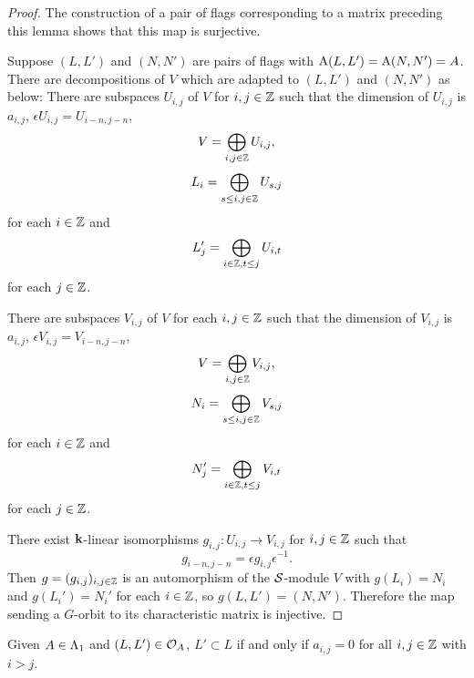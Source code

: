 \documentclass[a4paper, 11pt, twoside]{report}
\begin{document}
\begin{proof}
The construction of a pair of flags corresponding to a matrix preceding this lemma shows that this map is surjective.

Suppose $(L,L')$ and $(N,N')$ are pairs of flags with $\operatorname{A}(L,L')=\operatorname{A}(N,N')=A$. There are decompositions of $V$ which are adapted to $(L,L')$ and $(N,N')$ as below:
There are subspaces $U_{i,j}$ of $V$ for $i,j\in\mathbb{Z}$ such that the dimension of $U_{i,j}$ is $a_{i,j}$, $\epsilon U_{i,j}=U_{i-n,j-n}$,
\begin{equation*}
V=\bigoplus_{i,j\in\mathbb{Z}} U_{i,j},
\end{equation*}
\begin{equation*}
L_i = \bigoplus_{s\le i,j\in\mathbb{Z}} U_{s,j}
\end{equation*}
for each $i\in\mathbb{Z}$ and
\begin{equation*}
L_j' = \bigoplus_{i\in\mathbb{Z},t\le j} U_{i,t}
\end{equation*}
for each $j\in\mathbb{Z}$.

There are subspaces $V_{i,j}$ of $V$ for each $i,j\in\mathbb{Z}$ such that the dimension of $V_{i,j}$ is $a_{i,j}$, $\epsilon V_{i,j} = V_{i-n,j-n}$,
\begin{equation*}
V = \bigoplus_{i,j\in\mathbb{Z}} V_{i,j},
\end{equation*}
\begin{equation*}
N_i = \bigoplus_{s\le i,j\in\mathbb{Z}} V_{s,j}
\end{equation*}
for each $i\in\mathbb{Z}$ and
\begin{equation*}
N_j' = \bigoplus_{i\in\mathbb{Z},t\le j} V_{i,t}
\end{equation*}
for each $j\in\mathbb{Z}$.

There exist $\mathbf{k}$-linear isomorphisms $g_{i,j}\colon U_{i,j}\to V_{i,j}$ for $i,j\in\mathbb{Z}$ such that
\begin{equation*}
g_{i-n,j-n}=\epsilon g_{i,j}\epsilon^{-1}.
\end{equation*}
Then $g=(g_{i,j})_{i,j\in\mathbb{Z}}$ is an automorphism of the $\mathcal{S}$-module $V$ with $g(L_i)=N_i$ and $g(L_i')=N_i'$ for each $i\in\mathbb{Z}$, so $g(L,L')=(N,N')$. Therefore the map sending a $G$-orbit to its characteristic matrix is injective.
\end{proof}

\begin{lemma}
Given $A\in\Lambda_1{}$ and $(L,L')\in\mathcal{O}_{A}$, $L'\subset L$ if and only if $a_{i,j}=0$ for all $i,j\in\mathbb{Z}$ with $i>j$.
\end{lemma}
\end{document}
